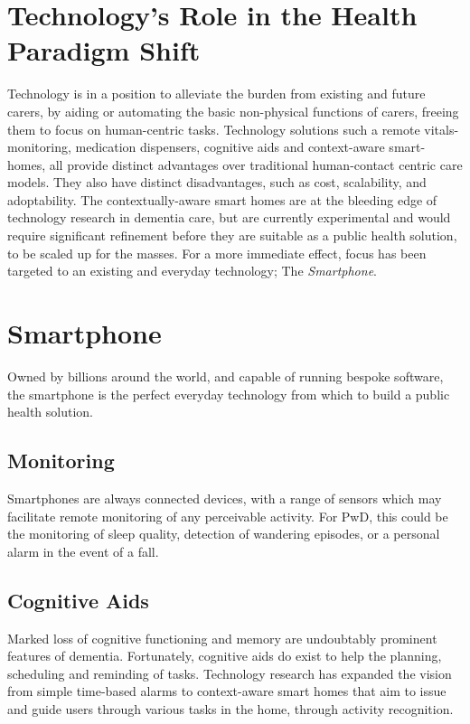 \section{Technology's Role in the Health Paradigm Shift}
Technology is in a position to alleviate the burden from existing and future carers, by aiding or automating the basic non-physical functions of carers, freeing them to focus on human-centric tasks.
Technology solutions such a remote vitals-monitoring, medication dispensers, cognitive aids and context-aware smart-homes, all provide distinct advantages over traditional human-contact centric care models. They also have distinct disadvantages, such as cost, scalability, and adoptability. The contextually-aware smart homes are at the bleeding edge of technology research in dementia care, but are currently experimental and would require significant refinement before they are suitable as a public health solution, to be scaled up for the masses.
For a more immediate effect, focus has been targeted to an existing and everyday technology; The \textit{Smartphone}.

\section{Smartphone}
Owned by billions around the world, and capable of running bespoke software, the smartphone is the perfect everyday technology from which to build a public health solution. 

\subsection{Monitoring}
Smartphones are always connected devices, with a range of sensors which may facilitate remote monitoring of any perceivable activity. For PwD, this could be the monitoring of sleep quality, detection of wandering episodes, or a personal alarm in the event of a fall.

\subsection{Cognitive Aids}
Marked loss of cognitive functioning and memory are undoubtably prominent features of dementia. Fortunately, cognitive aids do exist to help the planning, scheduling and reminding of tasks. Technology research has expanded the vision from simple time-based alarms to context-aware smart homes that aim to issue and guide users through various tasks in the home, through activity recognition.

